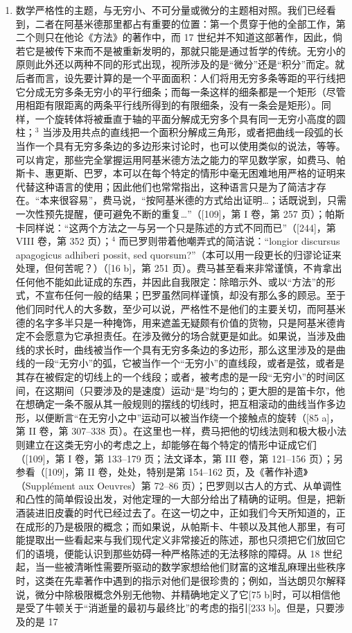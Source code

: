 \begin{enumerate}
\def\labelenumi{\Alph{enumi})}
\item
  数学严格性的主题，与无穷小、不可分量或微分的主题相对照。我们已经看到，二者在阿基米德那里都占有重要的位置：第一个贯穿于他的全部工作，第二个则只在他论《方法》的著作中，而 17 世纪并不知道这部著作，因此，倘若它是被传下来而不是被重新发明的，那就只能是通过哲学的传统。无穷小的原则此外还以两种不同的形式出现，视所涉及的是“微分”还是“积分”而定。就后者而言，设先要计算的是一个平面面积：人们将用无穷多条等距的平行线把它分成无穷多条无穷小的平行细条；而每一条这样的细条都是一个矩形（尽管用相距有限距离的两条平行线所得到的有限细条，没有一条会是矩形）。同样，一个旋转体将被垂直于轴的平面分解成无穷多个具有同一无穷小高度的圆柱；\(^{3}\) 当涉及用共点的直线把一个面积分解成三角形，或者把曲线一段弧的长当作一个具有无穷多条边的多边形来讨论时，也可以使用类似的说法，等等。可以肯定，那些完全掌握运用阿基米德方法之能力的罕见数学家，如费马、帕斯卡、惠更斯、巴罗，本可以在每个特定的情形中毫无困难地用严格的证明来代替这种语言的使用；因此他们也常常指出，这种语言只是为了简洁才存在。“本来很容易”，费马说，“按阿基米德的方式给出证明\ldots{}；话既说到，只需一次性预先提醒，便可避免不断的重复\ldots{}”（{[}109{]}，第 I 卷，第 257 页）；帕斯卡同样说：“这两个方法之一与另一个只是陈述的方式不同而已”（{[}244{]}，第 VIII 卷，第 352 页）；\(^{4}\) 而已罗则带着他嘲弄式的简洁说：“longior discursus apagogicus adhiberi possit, sed quorsum?”（本可以用一段更长的归谬论证来处理，但何苦呢？）（{[}16 b{]}，第 251 页）。费马甚至看来非常谨慎，不肯拿出任何他不能如此证成的东西，并因此自我限定：除暗示外、或以“方法”的形式，不宣布任何一般的结果；巴罗虽然同样谨慎，却没有那么多的顾忌。至于他们同时代人的大多数，至少可以说，严格性不是他们的主要关切，而阿基米德的名字多半只是一种掩饰，用来遮盖无疑颇有价值的货物，只是阿基米德肯定不会愿意为它承担责任。在涉及微分的场合就更是如此。如果说，当涉及曲线的求长时，曲线被当作一个具有无穷多条边的多边形，那么这里涉及的是曲线的一段“无穷小”的弧，它被当作一个“无穷小”的直线段，或者是弦，或者是其存在被假定的切线上的一个线段；或者，被考虑的是一段“无穷小”的时间区间，在这期间（只要涉及的是速度）运动“是”均匀的；更大胆的是笛卡尔，他在想确定一条不服从其一般规则的摆线的切线时，把互相滚动的曲线当作多边形，以便断言“在无穷小之中”运动可以被当作绕一个接触点的旋转（{[}85 a{]}，第 II 卷，第 307–338 页）。在这里也一样，费马把他的切线法则和极大极小法则建立在这类无穷小的考虑之上，却能够在每个特定的情形中证成它们（{[}109{]}，第 I 卷，第 133–179 页；法文译本，第 III 卷，第 121–156 页）；另参看（{[}109{]}，第 II 卷，处处，特别是第 154–162 页，及《著作补遗》（Supplément aux Oeuvres）第 72–86 页）；巴罗则以古人的方式、从单调性和凸性的简单假设出发，对他定理的一大部分给出了精确的证明。但是，把新酒装进旧皮囊的时代已经过去了。在这一切之中，正如我们今天所知道的，正在成形的乃是极限的概念；而如果说，从帕斯卡、牛顿以及其他人那里，有可能提取出一些看起来与我们现代定义非常接近的陈述，那也只须把它们放回它们的语境，便能认识到那些妨碍一种严格陈述的无法移除的障碍。从 18 世纪起，当一些被清晰性需要所驱动的数学家想给他们财富的这堆乱麻理出些秩序时，这类在先辈著作中遇到的指示对他们是很珍贵的；例如，当达朗贝尔解释说，微分中除极限概念外别无他物、并精确地定义了它{[}75 b{]}时，可以相信他是受了牛顿关于“消逝量的最初与最终比”的考虑的指引{[}233 b{]}。但是，只要涉及的是 17 
\end{enumerate}
